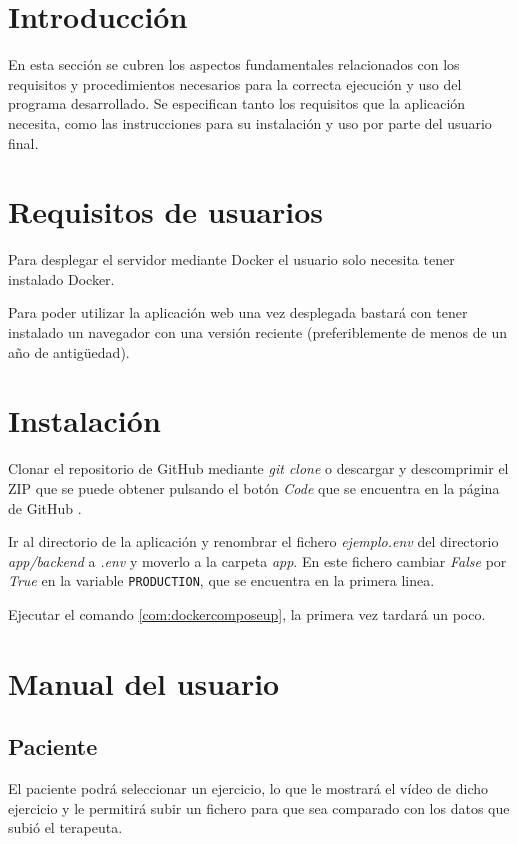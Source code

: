 
\section{Introducción}
En esta sección se cubren los aspectos fundamentales relacionados con los requisitos y procedimientos necesarios para la correcta ejecución y uso del programa desarrollado. Se especifican tanto los requisitos que la aplicación necesita, como las instrucciones para su instalación y uso por parte del usuario final.
\section{Requisitos de usuarios}
Para desplegar el servidor mediante Docker el usuario solo necesita tener instalado Docker.

Para poder utilizar la aplicación web una vez desplegada bastará con tener instalado un navegador con una versión reciente (preferiblemente de menos de un año de antigüedad).

\section{Instalación}

Clonar el repositorio de GitHub mediante \textit{git clone} o descargar y descomprimir el ZIP que se puede obtener pulsando el botón \textit{Code} que se encuentra en la página de GitHub \cite{repo}.

Ir al directorio de la aplicación y renombrar el fichero \textit{ejemplo.env} del directorio \textit{app/backend} a \textit{.env} y moverlo a la carpeta \textit{app}. En este fichero cambiar \textit{False} por \textit{True} en la variable \texttt{PRODUCTION}, que se encuentra en la primera linea.

Ejecutar el comando \ref{com:dockercomposeup}, la primera vez tardará un poco.


\section{Manual del usuario}

\subsection{Paciente}
El paciente podrá seleccionar un ejercicio, lo que le mostrará el vídeo de dicho ejercicio y le permitirá subir un fichero para que sea comparado con los datos que subió el terapeuta.
